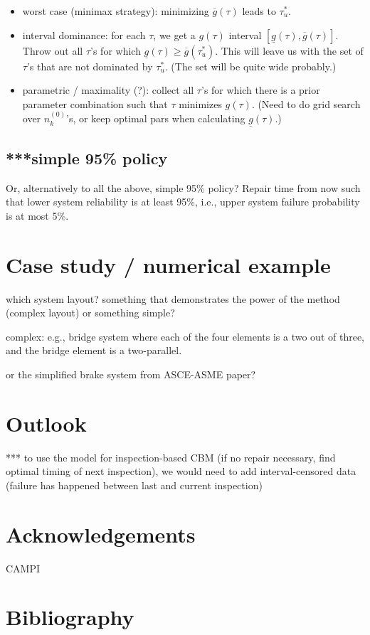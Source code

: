 \documentclass[authoryear]{elsarticle}
\newcommand{\uz}{^{(0)}} %
\newcommand{\ul}[1]{\underline{#1}}
\newcommand{\ol}[1]{\overline{#1}}
\newcommand{\lgt}{\ul{g}}
\newcommand{\ugt}{\ol{g}}
\def\nkz{n\uz_k}
\begin{document}
\begin{itemize}
\item worst case (minimax strategy): minimizing $\ugt(\tau)$ leads to $\tau^*_u$.
\item interval dominance: for each $\tau$, we get a $g(\tau)$ interval $[\lgt(\tau), \ugt(\tau)]$.
Throw out all $\tau$'s for which $\lgt(\tau) \ge \ugt(\tau^*_u)$.
This will leave us with the set of $\tau$'s that are not dominated by $\tau^*_u$.
(The set will be quite wide probably.)
\item parametric / maximality (?): collect all $\tau$'s for which there is a prior parameter combination such that $\tau$ minimizes $g(\tau)$.
(Need to do grid search over $\nkz$'s, or keep optimal pars when calculating $\lgt(\tau)$.)
\end{itemize}

\subsection{***simple 95\% policy}

Or, alternatively to all the above, simple 95\% policy?
Repair time from now such that lower system reliability is at least 95\%, i.e., upper system failure probability is at most 5\%.


\section{Case study / numerical example}

which system layout? something that demonstrates the power of the method (complex layout) or something simple?

complex: e.g., bridge system where each of the four elements is a two out of three, and the bridge element is a two-parallel.

or the simplified brake system from ASCE-ASME paper?


\section{Outlook}

*** to use the model for inspection-based CBM (if no repair necessary, find optimal timing of next inspection),
we would need to add interval-censored data (failure has happened between last and current inspection)



\section*{Acknowledgements}

CAMPI


\section*{Bibliography}




\end{document}
